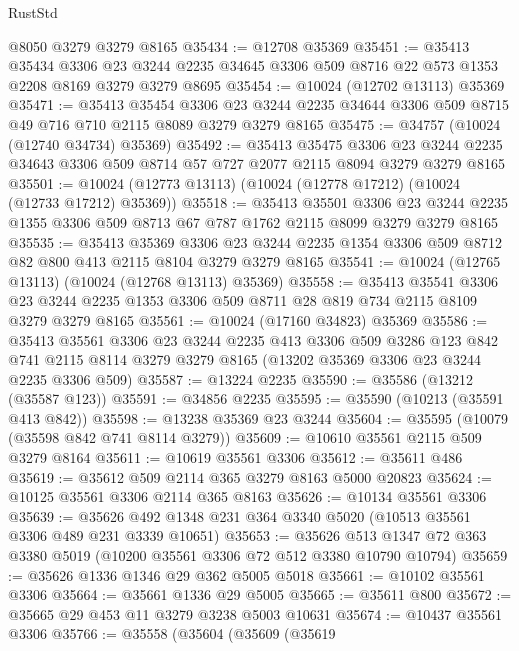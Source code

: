 \begin{lexlean}{RustStd}
\begin{coremodule}
{\begin{coremodule}
{{{{{{{{{{{{{{{{{{{{{{{{{{    @8050
    @3279
    @3279
    @8165
@35434 := @12708 @35369
@35451 := @35413
    @35434
    @3306
    @23
    @3244
    @2235
    @34645
    @3306
    @509
    @8716
    @22
    @573
    @1353
    @2208
    @8169
    @3279
    @3279
    @8695
@35454 := @10024 (@12702 @13113) @35369
@35471 := @35413
    @35454
    @3306
    @23
    @3244
    @2235
    @34644
    @3306
    @509
    @8715
    @49
    @716
    @710
    @2115
    @8089
    @3279
    @3279
    @8165
@35475 := @34757 (@10024 (@12740 @34734) @35369)
@35492 := @35413
    @35475
    @3306
    @23
    @3244
    @2235
    @34643
    @3306
    @509
    @8714
    @57
    @727
    @2077
    @2115
    @8094
    @3279
    @3279
    @8165
@35501 := @10024 (@12773 @13113) (@10024 (@12778 @17212) (@10024 (@12733 @17212) @35369))
@35518 := @35413
    @35501
    @3306
    @23
    @3244
    @2235
    @1355
    @3306
    @509
    @8713
    @67
    @787
    @1762
    @2115
    @8099
    @3279
    @3279
    @8165
@35535 := @35413
    @35369
    @3306
    @23
    @3244
    @2235
    @1354
    @3306
    @509
    @8712
    @82
    @800
    @413
    @2115
    @8104
    @3279
    @3279
    @8165
@35541 := @10024 (@12765 @13113) (@10024 (@12768 @13113) @35369)
@35558 := @35413
    @35541
    @3306
    @23
    @3244
    @2235
    @1353
    @3306
    @509
    @8711
    @28
    @819
    @734
    @2115
    @8109
    @3279
    @3279
    @8165
@35561 := @10024 (@17160 @34823) @35369
@35586 := @35413
    @35561
    @3306
    @23
    @3244
    @2235
    @413
    @3306
    @509
    @3286
    @123
    @842
    @741
    @2115
    @8114
    @3279
    @3279
    @8165
    (@13202 @35369 @3306 @23 @3244 @2235 @3306 @509)
@35587 := @13224 @2235
@35590 := @35586 (@13212 (@35587 @123))
@35591 := @34856 @2235
@35595 := @35590 (@10213 (@35591 @413 @842))
@35598 := @13238 @35369 @23 @3244
@35604 := @35595 (@10079 (@35598 @842 @741 @8114 @3279))
@35609 := @10610 @35561 @2115 @509 @3279 @8164
@35611 := @10619 @35561 @3306
@35612 := @35611 @486
@35619 := @35612 @509 @2114 @365 @3279 @8163 @5000 @20823
@35624 := @10125 @35561 @3306 @2114 @365 @8163
@35626 := @10134 @35561 @3306
@35639 := @35626 @492 @1348 @231 @364 @3340 @5020 (@10513 @35561 @3306 @489 @231 @3339 @10651)
@35653 := @35626 @513 @1347 @72 @363 @3380 @5019 (@10200 @35561 @3306 @72 @512 @3380 @10790 @10794)
@35659 := @35626 @1336 @1346 @29 @362 @5005 @5018
@35661 := @10102 @35561 @3306
@35664 := @35661 @1336 @29 @5005
@35665 := @35611 @800
@35672 := @35665 @29 @453 @11 @3279 @3238 @5003 @10631
@35674 := @10437 @35561 @3306
@35766 := @35558
    (@35604
      (@35609
        (@35619
}}}}}}}}}}}}}}}}}}}}}}}}}}
\end{coremodule}}
\end{coremodule}
\end{lexlean}
